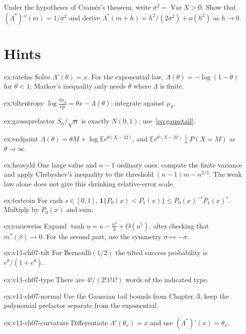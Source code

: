 \begin{exercise}[$\star\star$]\label{ex:v11-ch07-curvature}
Under the hypotheses of Cram\'er's theorem, write $\sigma^2=\operatorname{Var}X>0$. Show that $(\Lambda^*)''(m)=1/\sigma^2$ and derive $\Lambda^*(m+h)=h^2/(2\sigma^2)+o(h^2)$ as $h\to0$.
\end{exercise}

\section{Hints}

\begin{hint}{ex:ratefns}
Solve $\Lambda'(\theta)=x$. For the exponential law, $\Lambda(\theta)=-\log(1-\theta)$ for $\theta<1$; Markov's inequality only needs $\theta$ where $\Lambda$ is finite.
\end{hint}
\begin{hint}{ex:tiltentropy}
$\log\frac{\dd\mu_\theta}{\dd\mu}=\theta x-\Lambda(\theta)$; integrate against $\mu_\theta$.
\end{hint}
\begin{hint}{ex:gaussprefactor}
$S_n/\sqrt n$ is exactly $N(0,1)$; use~\eqref{eq:gausstail}.
\end{hint}
\begin{hint}{ex:endpoint}
$\Lambda(\theta)=\theta M+\log\mathbb Ee^{\theta(X-M)}$, and $\mathbb Ee^{\theta(X-M)}\downarrow P(X=M)$ as $\theta\to\infty$.
\end{hint}
\begin{hint}{ex:heavyld}
One large value and $n-1$ ordinary ones: compute the finite variance and apply Chebyshev's inequality to the threshold $(n-1)m-n^{2/3}$. The weak law alone does not give this shrinking relative-error scale.
\end{hint}
\begin{hint}{ex:testcoin}
For each $s\in[0,1]$, $\mathbf 1\{P_0(x)<P_1(x)\}\le P_0(x)^{-s}P_1(x)^s$. Multiply by $P_0(x)$ and sum.
\end{hint}
\begin{hint}{ex:curieweiss}
Expand $\tanh u=u-\frac{u^3}3+O(u^5)$, after checking that $m^*(\beta)\to0$. For the second part, use the symmetry $\sigma\mapsto-\sigma$.
\end{hint}

\begin{hint}{ex:v11-ch07-tilt}
For Bernoulli$(1/2)$ the tilted success probability is $e^\theta/(1+e^\theta)$.
\end{hint}
\begin{hint}{ex:v11-ch07-type}
There are $4!/(2!1!1!)$ words of the indicated type.
\end{hint}
\begin{hint}{ex:v11-ch07-normal}
Use the Gaussian tail bounds from Chapter~3; keep the polynomial prefactor separate from the exponential.
\end{hint}
\begin{hint}{ex:v11-ch07-curvature}
Differentiate $\Lambda'(\theta_x)=x$ and use $(\Lambda^*)'(x)=\theta_x$.
\end{hint}


